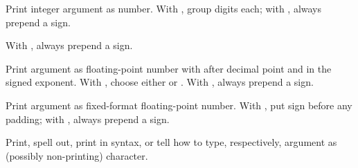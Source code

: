 \begin{LIST}{1cm}
\begin{LIST}{.5cm}
    {%
      Print integer argument as number. With \kwd{:}, group digits 
       each; with , always prepend a sign.
    }

    {%
       With
      , always pre\-pend a sign. 
    }

    {%
      Print argument as floating-point number with 
      after decimal point and  in the signed
      exponent. With , choose either  or
      . With , always prepend a sign. 
    }

    {%
      Print argument as fixed-format floating-point number. With \KWD{:},
      put sign before any padding; with , always prepend a
      sign.
    }
    
    {%
      Print, spell out, print in \kwd{\#$\backslash$} syntax, or tell
      how to type, respectively, argument as (possibly non-printing)
      character. 
    }


\end{LIST}
\end{LIST}
